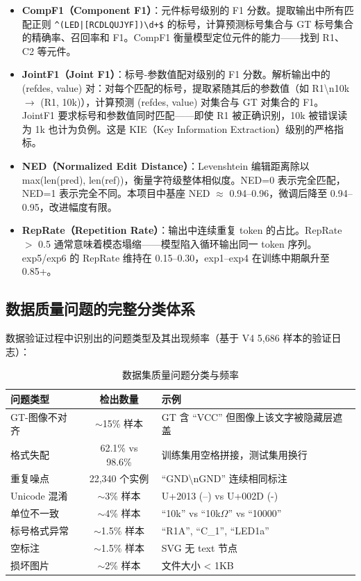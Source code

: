 \begin{itemize}[nosep]
    \item \textbf{CompF1（Component F1）}：元件标号级别的 F1 分数。提取输出中所有匹配正则 \texttt{\^{}(LED|[RCDLQUJYF])\textbackslash d+\$} 的标号，计算预测标号集合与 GT 标号集合的精确率、召回率和 F1。CompF1 衡量模型定位元件的能力——找到 R1、C2 等元件。
    \item \textbf{JointF1（Joint F1）}：标号-参数值配对级别的 F1 分数。解析输出中的 (refdes, value) 对：对每个匹配的标号，提取紧随其后的参数值（如 R1\textbackslash n10k $\to$ (R1, 10k)），计算预测 (refdes, value) 对集合与 GT 对集合的 F1。JointF1 要求标号和参数值同时匹配——即使 R1 被正确识别，10k 被错误读为 1k 也计为负例。这是 KIE（Key Information Extraction）级别的严格指标。
    \item \textbf{NED（Normalized Edit Distance）}：Levenshtein 编辑距离除以 max(len(pred), len(ref))，衡量字符级整体相似度。NED=0 表示完全匹配，NED=1 表示完全不同。本项目中基座 NED $\approx$ 0.94--0.96，微调后降至 0.94--0.95，改进幅度有限。
    \item \textbf{RepRate（Repetition Rate）}：输出中连续重复 token 的占比。RepRate $>$ 0.5 通常意味着模态塌缩——模型陷入循环输出同一 token 序列。exp5/exp6 的 RepRate 维持在 0.15--0.30，exp1--exp4 在训练中期飙升至 0.85+。
\end{itemize}

\subsection{数据质量问题的完整分类体系}

数据验证过程中识别出的问题类型及其出现频率（基于 V4 5,686 样本的验证日志）：

\begin{table}[h]
\centering
\caption{数据集质量问题分类与频率}
\scriptsize
\begin{tabular}{lcp{5cm}}
\toprule
\textbf{问题类型} & \textbf{检出数量} & \textbf{示例} \\
\midrule
GT-图像不对齐 & $\sim$15\% 样本 & GT 含 ``VCC'' 但图像上该文字被隐藏层遮盖 \\
格式失配 & 62.1\% vs 98.6\% & 训练集用空格拼接，测试集用换行 \\
重复噪点 & 22,340 个实例 & ``GND\textbackslash nGND'' 连续相同标注 \\
Unicode 混淆 & $\sim$3\% 样本 & U+2013 (–) vs U+002D (-) \\
单位不一致 & $\sim$4\% 样本 & ``10k'' vs ``10k$\Omega$'' vs ``10000'' \\
标号格式异常 & $\sim$1.5\% 样本 & ``R1A'', ``C\_1'', ``LED1a'' \\
空标注 & $\sim$1.5\% 样本 & SVG 无 text 节点 \\
损坏图片 & $\sim$2\% 样本 & 文件大小 < 1KB \\
\bottomrule
\end{tabular}
\end{table}

